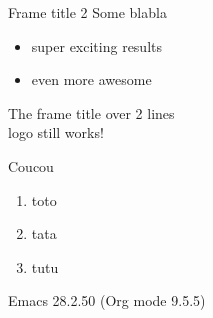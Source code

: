 \documentclass[presentation, aspectratio=169]{beamer}
\begin{document}
\begin{frame}[label={sec:org6c79061}]{Frame title 2}
Some blabla
\begin{itemize}
\item super exciting results
\item even more awesome
\end{itemize}
\end{frame}

\begin{frame}[label={sec:org03c0248}]{The frame title over 2 lines \\  logo still works!}
\begin{exampleblock}{Coucou}
\begin{enumerate}
\item toto
\item tata
\item tutu
\end{enumerate}
\end{exampleblock}
\end{frame}
Emacs 28.2.50 (Org mode 9.5.5)
\end{document}
